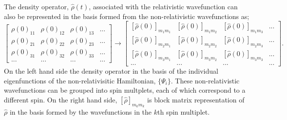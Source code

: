 \documentclass[12pt]{article}
\begin{document}
The density operator, $\hat{\rho}(t)$, associated with the relativistic wavefunction 
can also be represented in the basis formed from the non-relativistic wavefunctions as;
\begin{equation}
\begin{bmatrix}
\rho(0)_{11} &\rho(0)_{12} & \rho(0)_{13} & ...\\
\rho(0)_{21} &\rho(0)_{22} & \rho(0)_{23} & ...\\
\rho(0)_{31} &\rho(0)_{32} & \rho(0)_{33} &  ...\\
... & ... & ... & ...
\end{bmatrix}
\rightarrow
\begin{bmatrix}
[\hat{\rho}(0)]_{m_{1}m_{1}} &[\hat{\rho}(0)]_{m_{1}m_{2}} & [\hat{\rho}(0)]_{m_{1}m_{3}} & ...\\
[\hat{\rho}(0)]_{m_{2}m_{1}} &[\hat{\rho}(0)]_{m_{2}m_{2}} & [\hat{\rho}(0)]_{m_{2}m_{3}} & ...\\
[\hat{\rho}(0)]_{m_{3}m_{1}} &[\hat{\rho}(0)]_{m_{3}m_{2}} & [\hat{\rho}(0)]_{m_{3}m_{3}} &  ...\\
... & ... & ... & ...
\end{bmatrix}.
\end{equation}
\noindent On the left hand side the density operator in the basis of the individual eigenfunctions of the non-relativisitic
Hamiltonian, $\{\Psi_{i}\}$. These non-relativistic wavefunctions can be grouped into spin multplets, each of which correspond
to a different spin. On the right hand side,  $[\hat{\rho}]_{m_{k}m_{k}}$ is block matrix representation of  $\hat{\rho}$ in 
the basis formed by the wavefunctions in the $k$th spin multiplet. \\ 
\end{document}
